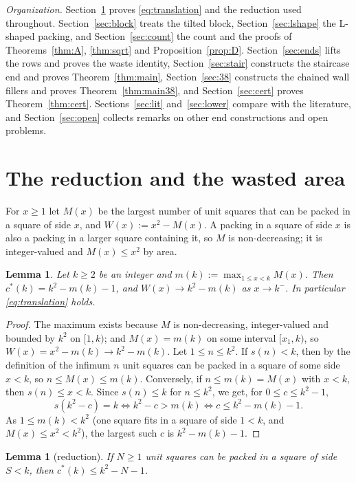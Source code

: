\documentclass[11pt]{amsart}
\newcommand{\cs}{c^{*}}
\newtheorem{lemma}[theorem]{Lemma}
\theoremstyle{definition}
\theoremstyle{remark}
\numberwithin{equation}{section}
\begin{document}
\emph{Organization.} Section~\ref{sec:prelim} proves \eqref{eq:translation} and the reduction used throughout.
Section~\ref{sec:block} treats the tilted block, Section~\ref{sec:lshape} the L-shaped packing, and
Section~\ref{sec:count} the count and the proofs of Theorems~\ref{thm:A}, \ref{thm:sqrt} and Proposition~\ref{prop:D}.
Section~\ref{sec:ends} lifts the rows and proves the waste identity, Section~\ref{sec:stair} constructs the staircase
end and proves Theorem~\ref{thm:main}, Section~\ref{sec:38} constructs the chained wall fillers and proves
Theorem~\ref{thm:main38}, and Section~\ref{sec:cert} proves Theorem~\ref{thm:cert}.
Sections~\ref{sec:lit} and~\ref{sec:lower} compare with the literature, and Section~\ref{sec:open} collects remarks on
other end constructions and open problems.

\section{The reduction and the wasted area}\label{sec:prelim}

For $x\ge1$ let $M(x)$ be the largest number of unit squares that can be packed in a square of side $x$, and
$W(x):=x^2-M(x)$. A packing in a square of side $x$ is also a packing in a larger square containing it, so $M$ is
non-decreasing; it is integer-valued and $M(x)\le x^2$ by area.

\begin{lemma}\label{lem:translation}
Let $k\ge2$ be an integer and $m(k):=\max_{1\le x<k}M(x)$. Then $\cs(k)=k^2-m(k)-1$, and $W(x)\to k^2-m(k)$ as
$x\to k^-$. In particular \eqref{eq:translation} holds.
\end{lemma}

\begin{proof}
The maximum exists because $M$ is non-decreasing, integer-valued and bounded by $k^2$ on $[1,k)$; and $M(x)=m(k)$ on
some interval $[x_1,k)$, so $W(x)=x^2-m(k)\to k^2-m(k)$. Let $1\le n\le k^2$. If $s(n)<k$, then by the definition of the
infimum $n$ unit squares can be packed in a square of some side $x<k$, so $n\le M(x)\le m(k)$. Conversely, if $n\le
m(k)=M(x)$ with $x<k$, then $s(n)\le x<k$. Since $s(n)\le k$ for $n\le k^2$, we get, for $0\le c\le k^2-1$,
\[
s(k^2-c)=k\iff k^2-c>m(k)\iff c\le k^2-m(k)-1 .
\]
As $1\le m(k)<k^2$ (one square fits in a square of side $1<k$, and $M(x)\le x^2<k^2$), the largest such $c$ is
$k^2-m(k)-1$.
\end{proof}

\begin{lemma}[reduction]\label{lem:reduction}
If $N\ge1$ unit squares can be packed in a square of side $S<k$, then $\cs(k)\le k^2-N-1$.
\end{lemma}
\end{document}
